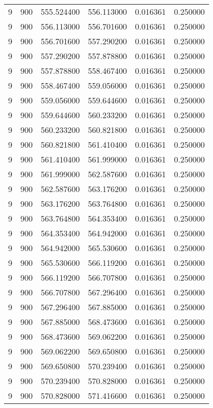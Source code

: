 \begin{longtable}{rrrrrr}
9 & 900 & 555.524400 & 556.113000 & 0.016361 & 0.250000 \\
9 & 900 & 556.113000 & 556.701600 & 0.016361 & 0.250000 \\
9 & 900 & 556.701600 & 557.290200 & 0.016361 & 0.250000 \\
9 & 900 & 557.290200 & 557.878800 & 0.016361 & 0.250000 \\
9 & 900 & 557.878800 & 558.467400 & 0.016361 & 0.250000 \\
9 & 900 & 558.467400 & 559.056000 & 0.016361 & 0.250000 \\
9 & 900 & 559.056000 & 559.644600 & 0.016361 & 0.250000 \\
9 & 900 & 559.644600 & 560.233200 & 0.016361 & 0.250000 \\
9 & 900 & 560.233200 & 560.821800 & 0.016361 & 0.250000 \\
9 & 900 & 560.821800 & 561.410400 & 0.016361 & 0.250000 \\
9 & 900 & 561.410400 & 561.999000 & 0.016361 & 0.250000 \\
9 & 900 & 561.999000 & 562.587600 & 0.016361 & 0.250000 \\
9 & 900 & 562.587600 & 563.176200 & 0.016361 & 0.250000 \\
9 & 900 & 563.176200 & 563.764800 & 0.016361 & 0.250000 \\
9 & 900 & 563.764800 & 564.353400 & 0.016361 & 0.250000 \\
9 & 900 & 564.353400 & 564.942000 & 0.016361 & 0.250000 \\
9 & 900 & 564.942000 & 565.530600 & 0.016361 & 0.250000 \\
9 & 900 & 565.530600 & 566.119200 & 0.016361 & 0.250000 \\
9 & 900 & 566.119200 & 566.707800 & 0.016361 & 0.250000 \\
9 & 900 & 566.707800 & 567.296400 & 0.016361 & 0.250000 \\
9 & 900 & 567.296400 & 567.885000 & 0.016361 & 0.250000 \\
9 & 900 & 567.885000 & 568.473600 & 0.016361 & 0.250000 \\
9 & 900 & 568.473600 & 569.062200 & 0.016361 & 0.250000 \\
9 & 900 & 569.062200 & 569.650800 & 0.016361 & 0.250000 \\
9 & 900 & 569.650800 & 570.239400 & 0.016361 & 0.250000 \\
9 & 900 & 570.239400 & 570.828000 & 0.016361 & 0.250000 \\
9 & 900 & 570.828000 & 571.416600 & 0.016361 & 0.250000 \\

\end{longtable}
